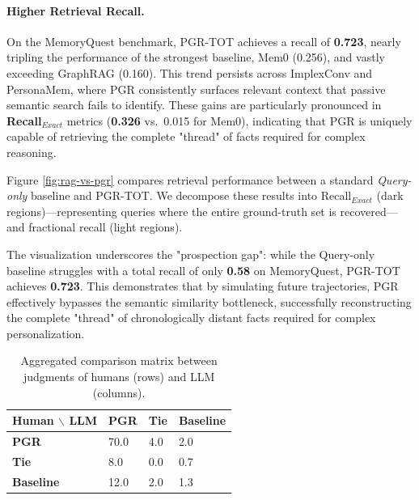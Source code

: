 \paragraph{Higher Retrieval Recall.} 
On the MemoryQuest benchmark, PGR-TOT achieves a recall of \textbf{0.723}, nearly tripling the performance of the strongest baseline, Mem0 (0.256), and vastly exceeding GraphRAG (0.160). This trend persists across ImplexConv and PersonaMem, where PGR consistently surfaces relevant context that passive semantic search fails to identify. These gains are particularly pronounced in \textbf{Recall$_{Exact}$} metrics (\textbf{0.326} vs.\ 0.015 for Mem0), indicating that PGR is uniquely capable of retrieving the complete "thread" of facts required for complex reasoning.


Figure \ref{fig:rag-vs-pgr} compares retrieval performance between a standard \textit{Query-only} baseline and PGR-TOT. We decompose these results into Recall$_{Exact}$ (dark regions)—representing queries where the entire ground-truth set is recovered—and fractional recall (light regions). 


The visualization underscores the "prospection gap": while the Query-only baseline struggles with a total recall of only \textbf{0.58} on MemoryQuest, PGR-TOT achieves \textbf{0.723}.  This demonstrates that by simulating future trajectories, PGR effectively bypasses the semantic similarity bottleneck, successfully reconstructing the complete "thread" of chronologically distant facts required for complex personalization.


\begin{table}
\centering
\renewcommand{\arraystretch}{1.2}
\setlength{\tabcolsep}{4pt} %
\vspace{-12pt}
\caption{Aggregated comparison matrix between judgments of humans (rows) and LLM (columns).}
\small
\begin{tabular}{l|>{\centering\arraybackslash}p{1.1cm}>{\centering\arraybackslash}p{1.1cm}>{\centering\arraybackslash}p{1.1cm}}
\toprule
\textbf{Human $\backslash$ LLM} & \textbf{PGR} & \textbf{Tie} & \textbf{Baseline} \\
\midrule
\textbf{PGR} & \cellcolor{pink!70} 70.0 & \cellcolor{pink!20} 4.0 & \cellcolor{pink!0} 2.0 \\
\textbf{Tie} & \cellcolor{pink!20} 8.0 & \cellcolor{pink!0} 0.0 & \cellcolor{pink!10} 0.7 \\
\textbf{Baseline} & \cellcolor{pink!40} 12.0 & \cellcolor{pink!20} 2.0 & \cellcolor{pink!20} 1.3 \\
\bottomrule
\end{tabular}
\label{tab:human-llm-matrix}
\vspace{-0pt}
\end{table}


